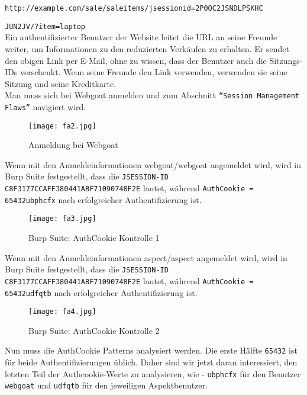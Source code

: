 \texttt{http://example.com/sale/saleitems/jsessionid=2P0OC2JSNDLPSKHC}

\texttt{JUN2JV/?item=laptop}\\

Ein authentifizierter Benutzer der Website leitet die URL an seine Freunde weiter, um Informationen zu den reduzierten Verkäufen zu erhalten. Er sendet den obigen Link per E-Mail, ohne zu wissen, dass der Benutzer auch die Sitzungs-IDs verschenkt. Wenn seine Freunde den Link verwenden, verwenden sie seine Sitzung und seine Kreditkarte.\\

Man muss sich bei Webgoat anmelden und zum Abschnitt \texttt{"`Session Management Flaws"'} navigiert wird.\\

\begin{figure}[h]
	\centering
	\texttt{[image: fa2.jpg]}
	\caption{Anmeldung bei Webgoat}
\end{figure}

Wenn mit den Anmeldeinformationen webgoat/webgoat angemeldet wird, wird in Burp Suite festgestellt, dass die \texttt{JSESSION-ID C8F3177CCAFF380441ABF71090748F2E} lautet, während \texttt{AuthCookie = 65432ubphcfx} nach erfolgreicher Authentifizierung ist.

\newpage

\begin{figure}[h]
	\centering
	\texttt{[image: fa3.jpg]}
	\caption{Burp Suite: AuthCookie Kontrolle 1}
\end{figure}

Wenn mit den Anmeldeinformationen aspect/aspect angemeldet wird, wird in Burp Suite festgestellt, dass die \texttt{JSESSION-ID C8F3177CCAFF380441ABF71090748F2E} lautet, während \texttt{AuthCookie = 65432udfqtb} nach erfolgreicher Authentifizierung ist.

\begin{figure}[h]
	\centering
	\texttt{[image: fa4.jpg]}
	\caption{Burp Suite: AuthCookie Kontrolle 2}
\end{figure}

Nun muss die AuthCookie Patterns analysiert werden. Die erste Hälfte \texttt{65432} ist für beide Authentifizierungen üblich. Daher sind wir jetzt daran interessiert, den letzten Teil der Authcookie-Werte zu analysieren, wie - \texttt{ubphcfx} für den Benutzer \texttt{webgoat} und \texttt{udfqtb} für den jeweiligen Aspektbenutzer.\\

